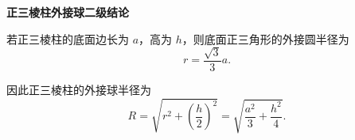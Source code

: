 \textbf{正三棱柱外接球二级结论}

若正三棱柱的底面边长为 $a$，高为 $h$，则底面正三角形的外接圆半径为
\[
	r=\frac{\sqrt3}{3}a.
\]

因此正三棱柱的外接球半径为
\[
	R=\sqrt{r^2+\left(\frac h2\right)^2}
	=\sqrt{\frac{a^2}{3}+\frac{h^2}{4}}.
\]